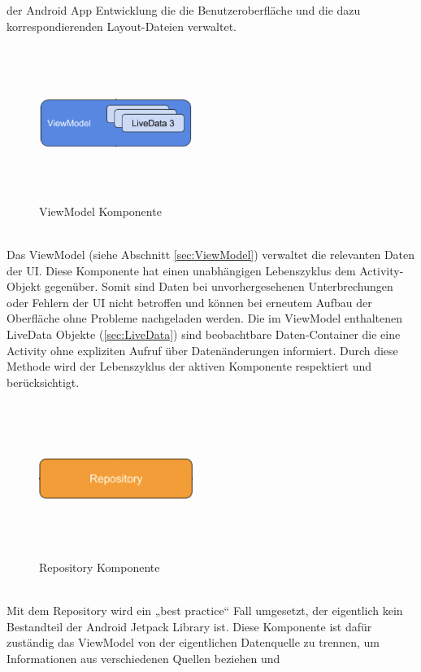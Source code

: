 der Android App Entwicklung die die Benutzeroberfläche und die dazu korrespondierenden Layout-Dateien verwaltet. 
\begin{figure}[hbt!]
    \centering
    \includegraphics[width=5cm,height=5cm,keepaspectratio]{2GrundlagenX/Bilder/viewModelComp.png}
    \caption{ViewModel Komponente \cite{aac.2020j}}
    \label{pic:vmComp}
\end{figure} 
\\ 
Das ViewModel (siehe Abschnitt \ref{sec:ViewModel}) verwaltet die relevanten Daten der UI. Diese Komponente hat einen unabhängigen Lebenszyklus 
dem Activity-Objekt gegenüber. Somit sind Daten bei unvorhergesehenen Unterbrechungen oder Fehlern der UI nicht betroffen und können bei 
erneutem Aufbau der Oberfläche ohne Probleme nachgeladen werden. Die im ViewModel enthaltenen LiveData Objekte (\ref{sec:LiveData}) sind 
beobachtbare Daten-Container die eine Activity ohne expliziten Aufruf über Datenänderungen informiert. Durch diese Methode wird der 
Lebenszyklus der aktiven Komponente respektiert und berücksichtigt. 
\begin{figure}[hbt!]
    \centering
    \includegraphics[width=5cm,height=5cm,keepaspectratio]{2GrundlagenX/Bilder/repoComp.png}
    \caption{Repository Komponente \cite{aac.2020j}}
    \label{pic:repoComp}
\end{figure} 
\\ 
Mit dem Repository wird ein „best practice“ Fall umgesetzt, der eigentlich kein Bestandteil der Android Jetpack Library ist. Diese Komponente 
ist dafür zuständig das ViewModel von der eigentlichen Datenquelle zu trennen, um Informationen aus verschiedenen Quellen beziehen und 
